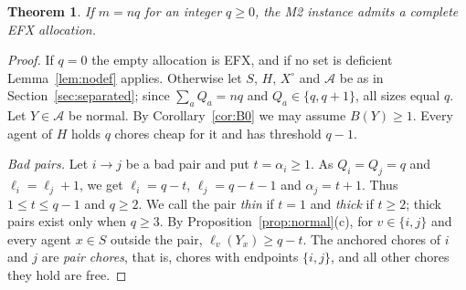 \documentclass{amsart}
\numberwithin{equation}{section}
\newtheorem{theorem}{Theorem}[section]
\theoremstyle{definition}
\theoremstyle{remark}
\newcommand{\cA}{\mathcal{A}}
\begin{document}
\begin{theorem}\label{thm:divisible}
If $m=nq$ for an integer $q\ge0$, the M2 instance admits a complete EFX allocation.
\end{theorem}

\begin{proof}
If $q=0$ the empty allocation is EFX, and if no set is deficient Lemma~\ref{lem:nodef} applies. Otherwise let $S$, $H$, $X^\circ$ and $\cA$ be as in Section~\ref{sec:separated}; since $\sum_aQ_a=nq$ and $Q_a\in\{q,q+1\}$, all sizes equal $q$. Let $Y\in\cA$ be normal. By Corollary~\ref{cor:B0} we may assume $B(Y)\ge1$. Every agent of $H$ holds $q$ chores cheap for it and has threshold $q-1$.

\emph{Bad pairs.} Let $i\to j$ be a bad pair and put $t=\alpha_i\ge1$. As $Q_i=Q_j=q$ and $\ell_i=\ell_j+1$, we get $\ell_i=q-t$, $\ell_j=q-t-1$ and $\alpha_j=t+1$. Thus $1\le t\le q-1$ and $q\ge2$. We call the pair \emph{thin} if $t=1$ and \emph{thick} if $t\ge2$; thick pairs exist only when $q\ge3$. By Proposition~\ref{prop:normal}(c), for $v\in\{i,j\}$ and every agent $x\in S$ outside the pair, $\ell_v(Y_x)\ge q-t$. The anchored chores of $i$ and $j$ are \emph{pair chores}, that is, chores with endpoints $\{i,j\}$, and all other chores they hold are free.


\end{proof}
\end{document}

